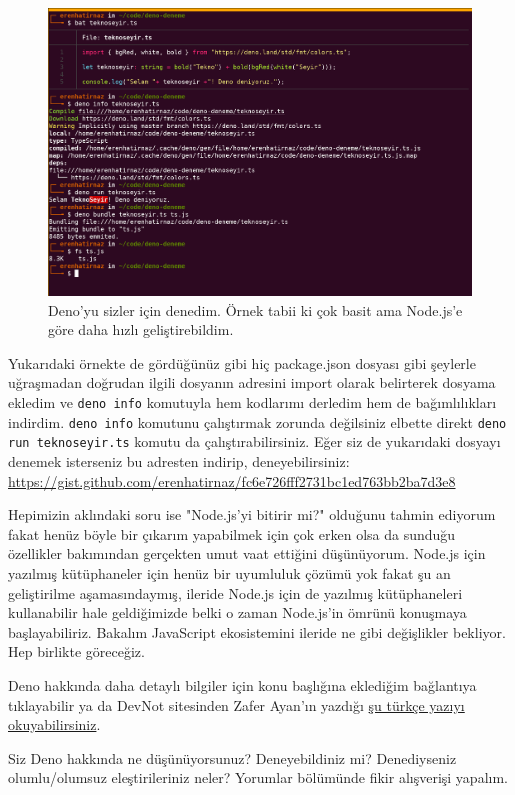 \documentclass[11pt]{article}
\begin{document}
\begin{figure}[htbp]
\centering
\includegraphics[width=.9\linewidth]{gorseller/deno-deniyoruz.png}
\caption{Deno'yu sizler için denedim. Örnek tabii ki çok basit ama Node.js'e göre daha hızlı geliştirebildim.}
\end{figure}

Yukarıdaki örnekte de gördüğünüz gibi hiç package.json dosyası gibi şeylerle
uğraşmadan doğrudan ilgili dosyanın adresini import olarak belirterek dosyama
ekledim ve \texttt{deno info} komutuyla hem kodlarımı derledim hem de bağımlılıkları
indirdim. \texttt{deno info} komutunu çalıştırmak zorunda değilsiniz elbette direkt
\texttt{deno run teknoseyir.ts} komutu da çalıştırabilirsiniz. Eğer siz de yukarıdaki
dosyayı denemek isterseniz bu adresten indirip, deneyebilirsiniz:
\url{https://gist.github.com/erenhatirnaz/fc6e726fff2731bc1ed763bb2ba7d3e8}

Hepimizin aklındaki soru ise "Node.js'yi bitirir mi?" olduğunu tahmin ediyorum
fakat henüz böyle bir çıkarım yapabilmek için çok erken olsa da sunduğu
özellikler bakımından gerçekten umut vaat ettiğini düşünüyorum. Node.js için
yazılmış kütüphaneler için henüz bir uyumluluk çözümü yok fakat şu an
geliştirilme aşamasındaymış, ileride Node.js için de yazılmış kütüphaneleri
kullanabilir hale geldiğimizde belki o zaman Node.js'in ömrünü konuşmaya
başlayabiliriz. Bakalım JavaScript ekosistemini ileride ne gibi değişlikler
bekliyor. Hep birlikte göreceğiz.

Deno hakkında daha detaylı bilgiler için konu başlığına eklediğim bağlantıya
tıklayabilir ya da DevNot sitesinden Zafer Ayan'ın yazdığı \href{http://devnot.com/2020/deno-nedir-nodejsin-sonunu-getirir-mi/}{şu türkçe yazıyı
okuyabilirsiniz}.

Siz Deno hakkında ne düşünüyorsunuz? Deneyebildiniz mi? Denediyseniz
olumlu/olumsuz eleştirileriniz neler? Yorumlar bölümünde fikir alışverişi
yapalım.
\end{document}
